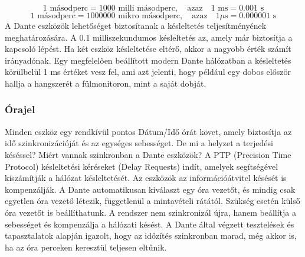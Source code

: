 \begin{equation}
	\label{eq:milliseconds}
	1 \text{ másodperc} = 1000 \text{ milli másodperc}, \quad \text{azaz} \quad 1 \text{ ms} = 0.001 \text{ s}
\end{equation}
\begin{equation}
	\label{eq:microseconds}
	1 \text{ másodperc} = 1000000 \text{ mikro másodperc}, \quad \text{azaz} \quad 1 \mu\text{s} = 0.000001 \text{ s}
\end{equation}
A Dante eszközök lehetőséget biztosítanak a késleltetés teljesítményének 
meghatározására. A 0.1 milliszekundumos késleltetés az, amely már biztosítja a 
kapcsoló lépést. Ha két eszköz késleltetése eltérő, akkor a nagyobb érték számít 
irányadónak. Egy megfelelően beállított modern Dante hálózatban a késleltetés 
körülbelül 1 ms értéket vesz fel, ami azt jelenti, hogy például egy dobos 
először hallja a hangszerét a fülmonitoron, mint a saját dobját.

\subsubsection{Órajel}

Minden eszköz egy rendkívül pontos Dátum/Idő órát követ, amely biztosítja az 
idő szinkronizációját és az egységes sebességet. De mi a helyzet a terjedési 
késéssel? Miért vannak szinkronban a Dante eszközök? A PTP (Precision Time Protocol) 
késleltetési kéréseket (Delay Requests) indít, amelyek segítségével kiszámítják 
a hálózat késleltetését. Az eszközök az információátvitel késését is kompenzálják. 
A Dante automatikusan kiválaszt egy óra vezetőt, és mindig csak egyetlen óra 
vezető létezik, függetlenül a mintavételi rátától. Szükség esetén külső óra 
vezetőt is beállíthatunk. A rendszer nem szinkronizál újra, hanem beállítja 
a sebességet és kompenzálja a hálózati késést. A Dante által végzett tesztelések 
és tapasztalatok alapján igazolt, hogy az időzítés szinkronban marad, még akkor 
is, ha az óra perceken keresztül teljesen eltűnik.


